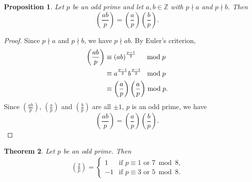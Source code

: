 \documentclass{amsbook}
\theoremstyle{plain}
\newtheorem{theorem}{Theorem}[chapter] %
\newtheorem{proposition}[theorem]{Proposition}
\theoremstyle{definition}
\theoremstyle{remark}
\numberwithin{equation}{chapter}
\numberwithin{figure}{chapter}
\newcommand{\Z}{\mathbb{Z}}
\begin{document}
\begin{proposition}\label{prop:legendre_sym_prod}
  Let $p$ be an odd prime and let $a, b \in \Z$ with $p \nmid a$ and $p \nmid b$. Then
  \[
    \left( \frac{ab}p \right) = \left( \frac{a}p \right) \left( \frac{b}p \right).
  \]
\end{proposition}
\begin{proof}
  Since $p \nmid a$ and $p \nmid b$, we have $p \nmid ab$. By Euler's criterion,
  \begin{align}
    \left( \frac{ab}p \right) &\equiv \left( ab \right)^{\frac{p-1}2} \hspace{ 4.6mm}\bmod p \\
                              &\equiv a^{\frac{p-1}2} b^{\frac{p-1}2} \hspace{2mm}\bmod p \\
                              &\equiv \left( \frac{a} p\right) \left( \frac{a} p\right) \bmod p.
  \end{align}
  Since $\left( \frac{ab}p \right)$, $\left( \frac{a}p \right)$ and $\left( \frac{b}p \right)$ are all $\pm 1$, $p$ is an odd prime, we have
  \[
    \left( \frac{ab}p \right) = \left( \frac{a}p \right) \left( \frac{b}p \right).
  \]
\end{proof}
\begin{theorem}\label{thm:qr_2nd_supp}
  Let $p$ be an odd prime. Then
  \begin{align}
    \left( \frac{2}p \right) =  \left\{ \begin{array}{rl}
                                                               1 & \text{if $p \equiv 1 \text { or } 7 \bmod 8$,} \\[2mm]
                                                               -1 & \text{if $p \equiv 3 \text { or } 5 \bmod 8$.}
                                                             \end{array} \right.
  \end{align}
\end{theorem}
\end{document}
